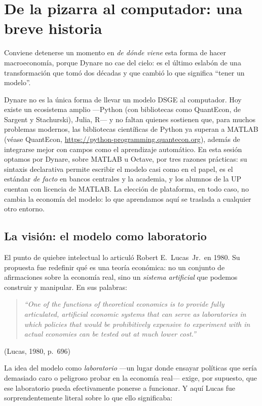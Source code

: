\documentclass[11pt,a4paper]{report}
\newcounter{tcbrem}[section]
\renewcommand{\thetcbrem}{\thesection.\arabic{tcbrem}}
\newenvironment{remark}{%
  \refstepcounter{tcbrem}%
  \begin{tcolorbox}[remarkstyle, title={Observación~\thetcbrem}]}%
{\end{tcolorbox}}
\begin{document}
\section{De la pizarra al computador: una breve historia}

Conviene detenerse un momento en \emph{de dónde viene} esta forma de hacer
macroeconomía, porque Dynare no cae del cielo: es el último eslabón de una
transformación que tomó dos décadas y que cambió lo que significa ``tener un
modelo''.

\begin{remark}
Dynare no es la única forma de llevar un modelo DSGE al computador. Hoy existe
un ecosistema amplio ---Python (con bibliotecas como QuantEcon, de Sargent y
Stachurski), Julia, R--- y no faltan quienes sostienen que, para muchos
problemas modernos, las bibliotecas científicas de Python ya superan a MATLAB
(véase QuantEcon, \url{https://python-programming.quantecon.org}), además de
integrarse mejor con campos como el aprendizaje automático. En esta sesión
optamos por Dynare, sobre MATLAB u Octave, por tres razones prácticas: su
sintaxis declarativa permite escribir el modelo casi como en el papel, es el
estándar \emph{de facto} en bancos centrales y la academia, y los alumnos de la
UP cuentan con licencia de MATLAB. La elección de plataforma, en todo caso, no
cambia la economía del modelo: lo que aprendamos aquí se traslada a cualquier
otro entorno.
\end{remark}

\subsection{La visión: el modelo como laboratorio}

El punto de quiebre intelectual lo articuló Robert E.\ Lucas~Jr.\ en
1980. Su propuesta fue redefinir qué es una teoría económica: no un conjunto de
afirmaciones sobre la economía real, sino un \emph{sistema artificial} que
podemos construir y manipular. En sus palabras:

\begin{quote}\itshape
``One of the functions of theoretical economics is to provide fully articulated,
artificial economic systems that can serve as laboratories in which policies
that would be prohibitively expensive to experiment with in actual economies
can be tested out at much lower cost.''
\end{quote}
\hfill{\small(Lucas, 1980, p.~696)}

\noindent La idea del modelo como \emph{laboratorio} ---un lugar donde ensayar
políticas que sería demasiado caro o peligroso probar en la economía real---
exige, por supuesto, que ese laboratorio pueda efectivamente ponerse a
funcionar. Y aquí Lucas fue sorprendentemente literal sobre lo que ello
significaba:
\end{document}
